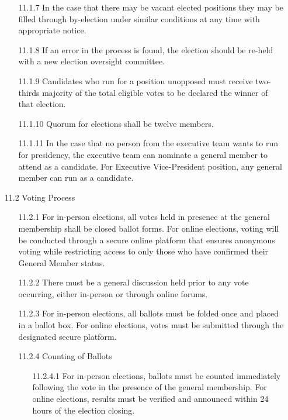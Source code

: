 \documentclass[12pt,a4paper]{article}
\begin{document}
\begin{enumerate}
\begin{enumerate}
\item[11.1.7] In the case that there may be vacant elected positions they may be filled through by-election under similar conditions at any time with appropriate notice.

\item[11.1.8] If an error in the process is found, the election should be re-held with a new election oversight committee.

\item[11.1.9] Candidates who run for a position unopposed must receive two-thirds majority of the total eligible votes to be declared the winner of that election.

\item[11.1.10] Quorum for elections shall be twelve members.

\item[11.1.11] In the case that no person from the executive team wants to run for presidency, the executive team can nominate a general member to attend as a candidate. For Executive Vice-President position, any general member can run as a candidate.
\end{enumerate}

\item[11.2] Voting Process

\begin{enumerate}
\item[11.2.1] For in-person elections, all votes held in presence at the general membership shall be closed ballot forms. For online elections, voting will be conducted through a secure online platform that ensures anonymous voting while restricting access to only those who have confirmed their General Member status.

\item[11.2.2] There must be a general discussion held prior to any vote occurring, either in-person or through online forums.

\item[11.2.3] For in-person elections, all ballots must be folded once and placed in a ballot box. For online elections, votes must be submitted through the designated secure platform.

\item[11.2.4] Counting of Ballots

\begin{enumerate}
\item[11.2.4.1] For in-person elections, ballots must be counted immediately following the vote in the presence of the general membership. For online elections, results must be verified and announced within 24 hours of the election closing.


\end{enumerate}
\end{enumerate}
\end{enumerate}
\end{document}
